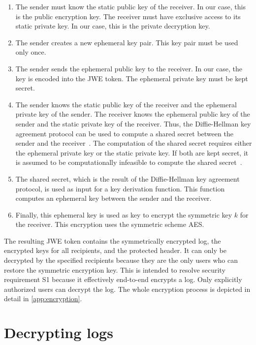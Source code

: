 \documentclass[../main.tex]{subfiles}
\begin{document}
\begin{enumerate}
    \item 
    The sender must know the static public key of the receiver. 
    In our case, this is the public encryption key.
    The receiver must have exclusive access to its static private key.
    In our case, this is the private decryption key.
    \item 
    The sender creates a new ephemeral key pair. 
    This key pair must be used only once.
    \item 
    The sender sends the ephemeral public key to the receiver.
    In our case, the key is encoded into the JWE token.
    The ephemeral private key must be kept secret.
    \item 
    The sender knows the static public key of the receiver and the ephemeral private key of the sender.
    The receiver knows the ephemeral public key of the sender and the static private key of the receiver.
    Thus, the Diffie-Hellman key agreement protocol can be used to compute a shared secret between the sender and the receiver~\cite[438]{Eckert2018}.
    The computation of the shared secret requires either the ephemeral private key or the static private key.
    If both are kept secret, it is assumed to be computationally infeasible to compute the shared secret~\cite[438]{Eckert2018}.
    \item 
    The shared secret, which is the result of the Diffie-Hellman key agreement protocol, is used as input for a key derivation function.
    This function computes an ephemeral key between the sender and the receiver.
    \item 
    Finally, this ephemeral key is used as key to encrypt the symmetric key $k$ for the receiver.
    This encryption uses the symmetric scheme AES.
\end{enumerate}


The resulting JWE token contains the symmetrically encrypted log, the encrypted keys for all recipients, and the protected header.
It can only be decrypted by the specified recipients because they are the only users who can restore the symmetric encryption key.
This is intended to resolve security requirement S1 because it effectively end-to-end encrypts a log.
Only explicitly authorized users can decrypt the log.
The whole encryption process is depicted in detail in \cref{app:encryption}.

\section{Decrypting logs}\label{sec:decrypting}
\end{document}
